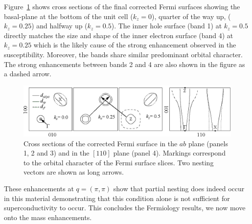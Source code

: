 Figure~\ref{Fig:ResD:ZSlices} shows cross sections of the final corrected Fermi surfaces showing the basal-plane at the bottom of the unit cell ($k_z=0$), quarter of the way up, ($k_z=0.25$) and halfway up ($k_z=0.5$). The inner hole surface (band 1) at $k_z=0.5$ directly matches the size and shape of the inner electron surface (band 4) at $k_z=0.25$ which is the likely cause of the strong enhancement observed in the susceptibility. Moreover, the bands share similar predominant \DxzDyz{} orbital character. The strong enhancements between bands 2 and 4 are also shown in the figure as a dashed arrow.

\begin{figure}[htbp]
    \begin{center}
        \includegraphics[scale=0.9]{Chapter-dHvABaFe2P2/Figures/AngleDepMeasurements/ZSlices/ZSlices}
        \caption{Cross sections of the corrected Fermi surface in the $ab$ plane (panels 1, 2 and 3) and in the $[110]$ plane (panel 4). Markings correspond to the orbital character of the Fermi surface slices. Two nesting vectors are shown as long arrows.}
        \label{Fig:ResD:ZSlices}
    \end{center}
\end{figure}

These enhancements at $q=(\pi, \pi)$ show that partial nesting does indeed occur in this material demonstrating that this condition alone is not sufficient for superconductivity to occur. This concludes the Fermiology results, we now move onto the mass enhancements.


